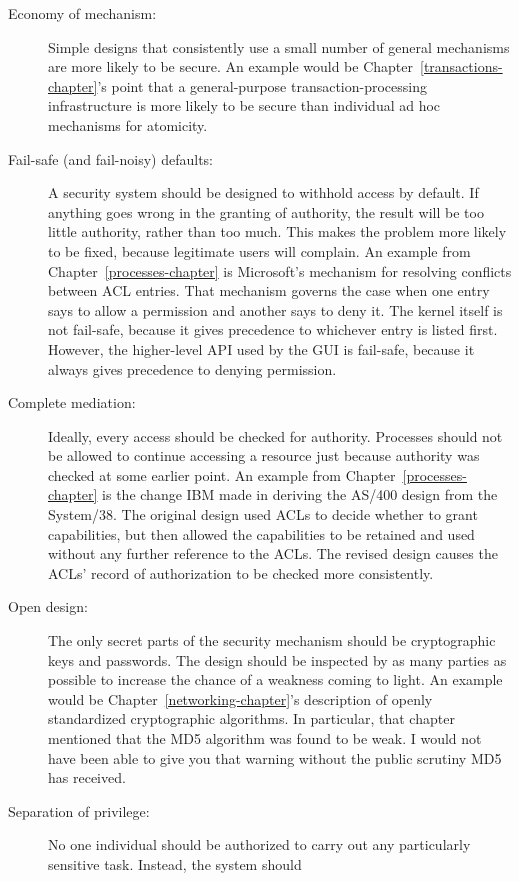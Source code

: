 \begin{description}
\item[Economy of mechanism:]
Simple designs that consistently use a small
number of general mechanisms are more likely to be secure.  An
example would be Chapter~\ref{transactions-chapter}'s point that a
general-purpose transaction-processing infrastructure is more likely
to be secure than individual ad hoc mechanisms for atomicity.
\item[Fail-safe (and fail-noisy) defaults:]
A security system should be
designed to withhold access by default.  If anything goes wrong in the
granting of authority, the result will be too little authority, rather
than too much.  This makes the problem more likely to be fixed,
because legitimate users will complain.  An
example from Chapter~\ref{processes-chapter} is Microsoft's mechanism
for resolving conflicts between ACL entries. That mechanism governs the case when one entry says to allow a
permission and another says to deny it.  The kernel itself is not
fail-safe, because it gives precedence to whichever entry is listed
first.  However, the higher-level API used by the GUI is fail-safe,
because it always gives precedence to denying permission.
\item[Complete mediation:]
Ideally, every access should be checked for
authority.  Processes should not be allowed to continue accessing a
resource just because authority was checked at some earlier point.  An
example from Chapter~\ref{processes-chapter} is the change IBM made in
deriving the AS/400 design from the System/38.  The original design
used ACLs to decide whether to grant capabilities, but then allowed
the capabilities to be retained and used without any further reference
to the ACLs.  The revised design causes the ACLs' record of
authorization to be checked more consistently.
\item[Open design:]
The only secret parts of the security mechanism should be
cryptographic keys and passwords.  The design should be inspected by
as many parties as possible to increase the chance of a weakness
coming to light.  An example would be
Chapter~\ref{networking-chapter}'s description of openly standardized
cryptographic algorithms.  In particular, that chapter mentioned that
the MD5 algorithm was found to be weak.  I would not have been
able to give you that warning without the public scrutiny MD5 has
received.
\item[Separation of privilege:]
No one individual should be authorized to
carry out any particularly sensitive task.  Instead, the system should

\end{description}
